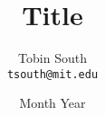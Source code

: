 \documentclass{article}
\title{Title}
\date{Month Year}
\author{Tobin South\\\texttt{tsouth@mit.edu} \\}
\begin{document}
\maketitle

\begin{abstract}

\end{abstract}

\the\textwidth

% 
% 
\end{document}
